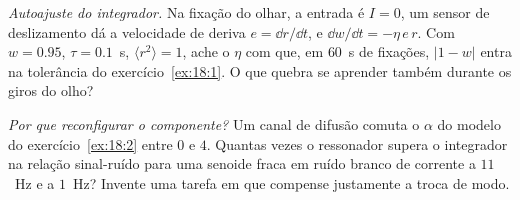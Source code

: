 \begin{exercise}[\lvlB]
\label{ex:18:6}
\emph{Autoajuste do integrador.} Na fixação do olhar, a entrada é $I=0$, um sensor de deslizamento dá a velocidade de deriva $e=\dd r/\dd t$, e $\dd w/\dd t=-\eta\,e\,r$. Com $w=0.95$, $\tau=0.1$~s, $\langle r^2\rangle=1$, ache o $\eta$ com que, em $60$~s de fixações, $|1-w|$ entra na tolerância do exercício~\ref{ex:18:1}. O que quebra se aprender também durante os giros do olho?
\end{exercise}

\begin{exercise}[\lvlC]
\label{ex:18:7}
\emph{Por que reconfigurar o componente?} Um canal de difusão comuta o $\alpha$ do modelo do exercício~\ref{ex:18:2} entre $0$ e $4$. Quantas vezes o ressonador supera o integrador na relação sinal-ruído para uma senoide fraca em ruído branco de corrente a $11$~Hz e a $1$~Hz? Invente uma tarefa em que compense justamente a troca de modo.
\end{exercise}
